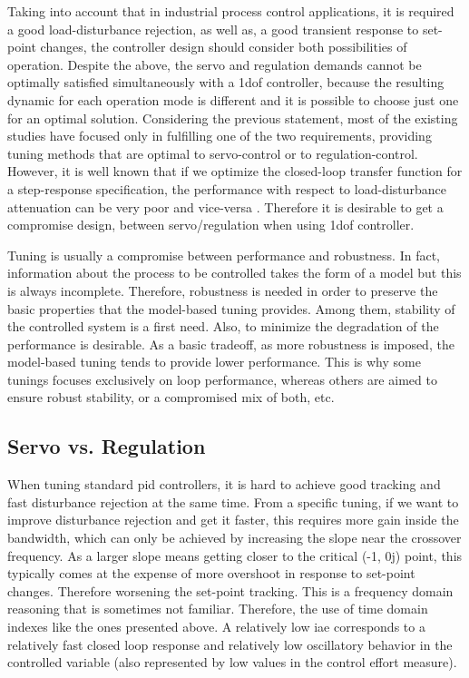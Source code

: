 Taking into account that in industrial process control applications, it is required a good load-disturbance rejection, as well as, a good transient response to set-point changes, the controller design should consider both possibilities of operation. Despite the above, the servo and regulation demands cannot be optimally satisfied simultaneously with a \gls{1dof} controller, because the resulting dynamic for each operation mode is different and it is possible to choose just one for an optimal solution. Considering the previous statement, most of the existing studies have focused only in fulfilling one of the two requirements, providing tuning methods that are optimal to servo-control or to regulation-control. However, it is well known that if we optimize the closed-loop transfer function for a step-response specification, the performance with respect to load-disturbance attenuation can be very poor and vice-versa \cite{Arrieta2010a}. Therefore it is desirable to get a compromise design, between servo/regulation when using \gls{1dof} controller.

Tuning is usually a compromise between performance and robustness. In fact, information about the process to be controlled takes the form of a model but this is always incomplete. Therefore, robustness is needed in order to preserve the basic properties that the model-based tuning provides. Among them, stability of the controlled system is a first need. Also, to minimize the degradation of the performance is desirable. As a basic tradeoff, as more robustness is imposed, the model-based tuning tends to provide lower performance. This is why some tunings focuses exclusively on loop performance, whereas others are aimed to ensure robust stability, or a compromised mix of both, etc. 

\subsection{Servo vs. Regulation}
%
When tuning standard \gls{pid} controllers, it is hard to achieve good tracking and fast disturbance rejection at the same time. From a specific tuning, if we want to improve disturbance rejection and get it faster, this requires more gain inside the bandwidth, which can only be achieved by increasing the slope near the crossover frequency. As a larger slope means getting closer to the critical (-1, 0j) point, this typically comes at the expense of more overshoot in response to set-point changes. Therefore worsening the set-point tracking. This is a frequency domain reasoning that is sometimes not familiar. Therefore, the use of time domain indexes like the ones presented above. A relatively low \gls{iae} corresponds to a relatively fast closed loop response and relatively low oscillatory behavior in the controlled variable (also represented by low values in the control effort measure). 
 
